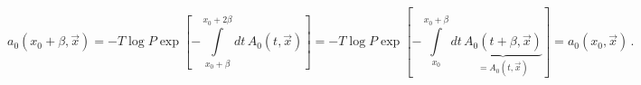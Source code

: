 \begin{equation}
  \label{eq:a0period}
a_0(x_0+\beta,\vec x) = -T \log P \exp 
\left[-\int\limits_{x_0+\beta}^{x_0+2\beta} dt \, A_0(t,\vec x) \right] 
= -T \log P \exp 
\left[-\int\limits_{x_0}^{x_0+\beta} dt \, 
\underbrace{A_0(t+\beta,\vec x)}_{=A_0(t,\vec x)} \right] 
= a_0(x_0,\vec x)   \,.
\end{equation}

